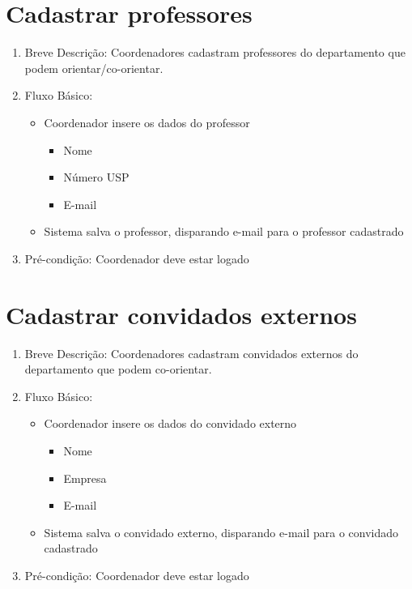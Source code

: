 \section{Cadastrar professores}
\begin{enumerate}
    \item Breve Descrição: Coordenadores cadastram professores do departamento que podem orientar/co-orientar.
    \item Fluxo Básico:
    \begin{itemize}
        \item Coordenador insere os dados do professor
        \begin{itemize}
            \item Nome
            \item Número USP
            \item E-mail
        \end{itemize}
        \item Sistema salva o professor, disparando e-mail para o professor cadastrado
    \end{itemize}
    \item Pré-condição: Coordenador deve estar logado
\end{enumerate}

\section{Cadastrar convidados externos}
\begin{enumerate}
    \item Breve Descrição: Coordenadores cadastram convidados externos do departamento que podem co-orientar.
    \item Fluxo Básico:
    \begin{itemize}
        \item Coordenador insere os dados do convidado externo
        \begin{itemize}
            \item Nome
            \item Empresa
            \item E-mail
        \end{itemize}
        \item Sistema salva o convidado externo, disparando e-mail para o convidado cadastrado
    \end{itemize}
    \item Pré-condição: Coordenador deve estar logado
\end{enumerate}

